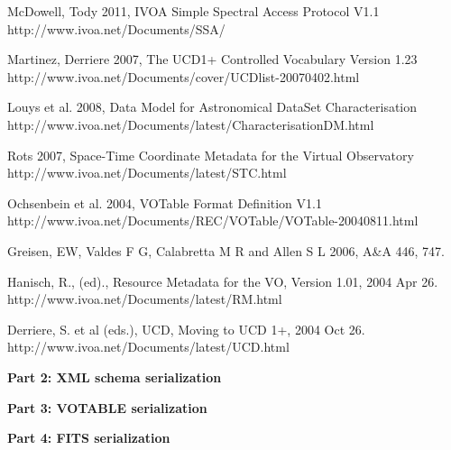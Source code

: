 \documentclass[11pt]{article}
\newcommand{\htpart}[1]{\centerline{\bf #1}}
\begin{document}
McDowell, Tody 2011,
IVOA Simple Spectral Access Protocol V1.1 \\ 
http://www.ivoa.net/Documents/SSA/

\vskip 0.1in
\par\noindent
Martinez, Derriere 2007,
The UCD1+ Controlled Vocabulary Version 1.23 \\ 
http://www.ivoa.net/Documents/cover/UCDlist-20070402.html

\vskip 0.1in
\par\noindent
Louys et al. 2008,
Data Model for Astronomical DataSet Characterisation \\ 
http://www.ivoa.net/Documents/latest/CharacterisationDM.html

\vskip 0.1in
\par\noindent
Rots 2007,
Space-Time Coordinate Metadata for the Virtual Observatory \\ 
http://www.ivoa.net/Documents/latest/STC.html

\vskip 0.1in
\par\noindent
Ochsenbein et al. 2004,
VOTable Format Definition V1.1 \\ 
http://www.ivoa.net/Documents/REC/VOTable/VOTable-20040811.html

\vskip 0.1in
\par\noindent
Greisen, EW, Valdes F G, Calabretta M R and Allen S L 2006,
A\&A 446, 747.\\
\vskip 0.1in
\par\noindent
Hanisch, R., (ed)., Resource Metadata for the VO, Version 1.01,
2004 Apr 26.  \\
http://www.ivoa.net/Documents/latest/RM.html

\vskip 0.1in
\par\noindent
Derriere, S. et al (eds.), UCD, Moving to UCD 1+, 2004 Oct 26.
\\
http://www.ivoa.net/Documents/latest/UCD.html


\clearpage





{\Large
\vfill
\htpart{Part 2: XML schema serialization}
\vfill
}


\clearpage




\clearpage



{\Large
\vfill
\vskip 5.0in
\htpart{Part 3: VOTABLE serialization}
\vfill
}

\clearpage

\clearpage




{\Large
\vfill
\vskip 5.0in
\htpart{Part 4: FITS serialization}
\vfill
}

\clearpage

\end{document}
